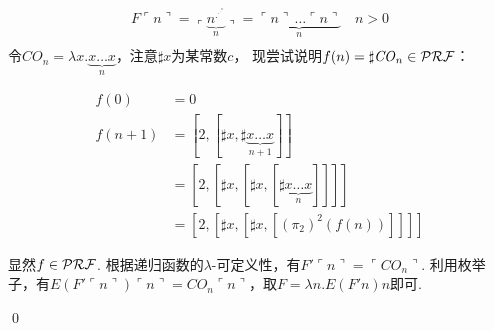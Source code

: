 \begin{pf} \rm 
   $$
\begin{aligned}
    F \ulcorner n \urcorner = \left\ulcorner \underbrace{n^{.^{.^{.^n}}}}_{n} \right\urcorner = \underbrace{\ulcorner n \urcorner\,\dots\ulcorner n \urcorner}_{n}  \quad n>0 \\ 
\end{aligned}
   $$
   令$\mathit{CO}_n = \lambda x.\underbrace{x\dots x}_{n}$，注意$\sharp x$为某常数$c$，
   现尝试说明$f(n) = \sharp \mathit{CO}_n \in\mathcal{PRF}$：
   
    $$
    \begin{aligned}
        f(0) &= 0\\
        f(n+1) &= [2, [\sharp x, \sharp \underbrace{x\dots x}_{n+1}]]\\
        &= [2, [\sharp x, [\sharp x, [\sharp \underbrace{x\dots x}_{n}]]]]\\
        &= [2, [\sharp x, [\sharp x, [(\pi_2)^2(f(n))]]]]
    \end{aligned}
    $$

   显然$f\in\mathcal{PRF}$. 根据递归函数的$\lambda$-可定义性，有$F'\ulcorner n\urcorner = \ulcorner \mathit{CO}_n \urcorner$. 利用枚举子，有$E (F' \ulcorner n \urcorner) \ulcorner n \urcorner = CO_n \ulcorner n \urcorner$，取$F = \lambda n. E (F' n) n$即可.
   
   \qed
\end{pf}